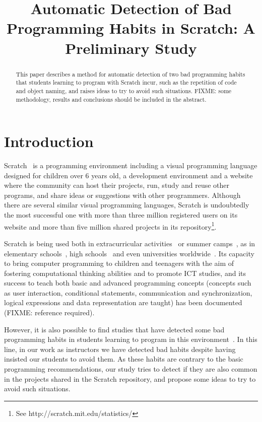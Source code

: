 \documentclass[conference]{format/IEEEtran}
\title{Automatic Detection of Bad Programming Habits in Scratch: A Preliminary Study}
\author{\IEEEauthorblockN{Jesús Moreno}
\IEEEauthorblockA{INTEF \& Programamos.es\\
Madrid, Spain\\
j.morenol@gmail.com}
\and
\IEEEauthorblockN{Gregorio Robles}
\IEEEauthorblockA{GSyC/LibreSoft\\Universidad Rey Juan Carlos\\
Madrid, Spain\\
grex@gsyc.urjc.es}}
\begin{document}
\maketitle

\begin{abstract}
This paper describes a method for automatic detection of two bad programming habits that students learning to program with Scratch incur, such as the repetition of code and object naming, and raises ideas to try to avoid such situations. FIXME: some methodology, results and conclusions should be included in the abstract.

\end{abstract}

\section{Introduction}

Scratch~\cite{resnick2009scratch}  is a programming environment including a visual programming language designed for children over 6 years old, a development environment and a website where the community can host their projects, run, study and reuse other programs, and share ideas or suggestions with other programmers. Although there are several similar visual programming languages, Scratch is undoubtedly the most successful one with more than three million registered users on its website and more than five million shared projects in its repository\footnote{See http://scratch.mit.edu/statistics/}.

Scratch is being used both in extracurricular activities~\cite{maloney2008programming, kafai2010entering} or summer camps~\cite{adams2010scratching, franklin2013assessment}, as in elementary schools~\cite{wilson2012evaluation}, high schools~\cite{meerbaum2013learning} and even universities worldwide~\cite{wolz2009starting, malan2007scratch}. Its capacity to bring computer programming to children and teenagers with the aim of fostering computational thinking abilities and to promote ICT studies, and its success to teach both basic and advanced programming concepts (concepts such as user interaction, conditional statements, communication and synchronization, logical expressions and data representation are taught) has been documented (FIXME: reference required).

However, it is also possible to find studies that have detected some bad programming habits in students learning to program in this environment~\cite{meerbaum2011habits}. In this line, in our work as instructors we have detected bad habits despite having insisted our students to avoid them. As these habits are contrary to the basic programming recommendations, our study tries to detect if they are also common in the projects shared in the Scratch repository, and propose some ideas to try to avoid such situations.
\end{document}
